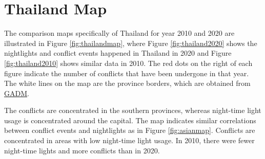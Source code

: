 \documentclass[11pt]{article}
\begin{document}
\section{Thailand Map}
The comparison maps specifically of Thailand for year 2010 and 2020 are illustrated in Figure \ref{fig:thailandmap}, where Figure \ref{fig:thailand2020} shows the nightlights and conflict events happened in Thailand in 2020 and Figure \ref{fig:thailand2010} shows similar data in 2010. The red dots on the right of each figure indicate the number of conflicts that have been undergone in that year. The white lines on the map are the province borders, which are obtained from \href{https://gadm.org/download_country.html#google_vignette}{GADM}. 

The conflicts are concentrated in the southern provinces, whereas night-time light usage is concentrated around the capital. The map indicates similar correlations between conflict events and nightlights as in Figure \ref{fig:asianmap}. Conflicts are concentrated in areas with low night-time light usage. In 2010, there were fewer night-time lights and more conflicts than in 2020.
\end{document}
